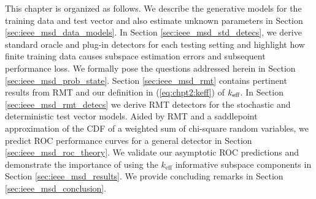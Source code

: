 This chapter is organized as follows. We describe the generative models for the training data and test vector and also estimate unknown parameters in Section \ref{sec:ieee_msd_data_models}. In Section \ref{sec:ieee_msd_std_detecs}, we derive standard oracle and plug-in detectors for each testing setting and highlight how finite training data causes subspace estimation errors and subsequent performance loss. We formally pose the questions addressed herein in Section \ref{sec:ieee_msd_prob_state}. Section \ref{sec:ieee_msd_rmt} contains pertinent results from RMT and our definition in (\ref{eq:chpt2:keff}) of $k_\text{eff}$. In Section \ref{sec:ieee_msd_rmt_detecs} we derive RMT detectors for the stochastic and deterministic test vector models. Aided by RMT and a saddlepoint approximation of the CDF of a weighted sum of chi-square random variables, we predict ROC performance curves for a general detector in Section \ref{sec:ieee_msd_roc_theory}. We validate our asymptotic ROC predictions and demonstrate the importance of using the $k_\text{eff}$ informative subspace components in Section \ref{sec:ieee_msd_results}. We provide concluding remarks in Section \ref{sec:ieee_msd_conclusion}.





